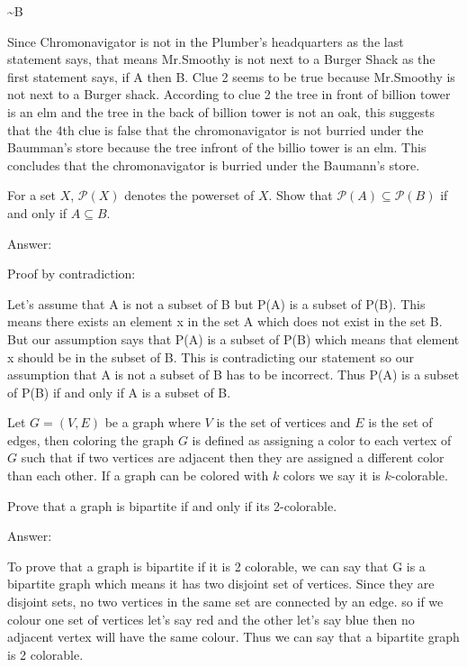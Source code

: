 \documentclass[a4paper]{exam}
\begin{document}
\begin{questions}
\begin{answer}
\;\;\; \sim B

Since Chromonavigator is not in the Plumber's headquarters as the last statement says, that means Mr.Smoothy is not next to a Burger Shack as the first statement says, if A then B. Clue 2 seems to be true because Mr.Smoothy is not next to a Burger shack. According to clue 2 the tree in front of billion tower is an elm and the tree in the back of billion tower is not an oak, this suggests that the 4th clue is false that the chromonavigator is not burried under the Baumman's store because the tree infront of the billio tower is an elm. This concludes that the chromonavigator is burried under the Baumann's store.

\end{answer}

For a set $X$, $\mathcal{P}(X)$ denotes the powerset of $X$.
Show that $ \mathcal{P}(A) \subseteq \mathcal {P}(B)$ if and only if $ A \subseteq B$.
\begin{answer}
Answer:

Proof by contradiction:

Let's assume that A is not a subset of B but P(A) is a subset of P(B). This means there exists an element x in the set A which does not exist in the set B. But our assumption says that P(A) is a subset of P(B) which means that element x should be in the subset of B. This is contradicting our statement so our assumption that A is not a subset of B has to be incorrect. Thus P(A) is a subset of P(B) if and only if A is a subset of B.
\end{answer}


Let $G = (V, E)$ be a graph where $V$ is the set of vertices and $E$ is the set of edges, then
coloring the graph $G$ is defined as assigning a color to each vertex of $G$ such that if two vertices are adjacent then they are assigned a different color than each other. 
If a graph can be colored with $k$ colors we say it is $k$-colorable.

Prove that a graph is bipartite if and only if its 2-colorable.
\begin{answer}

Answer:

To prove that a graph is bipartite if it is 2 colorable, we can say that G is a bipartite graph which means it has two disjoint set of vertices. Since they are disjoint sets, no two vertices in the same set are connected by an edge. so if we colour one set of vertices let's say red and the other let's say blue then no adjacent vertex will have the same colour. Thus we can say that a bipartite graph is 2 colorable.


\end{answer}
\end{questions}
\end{document}
